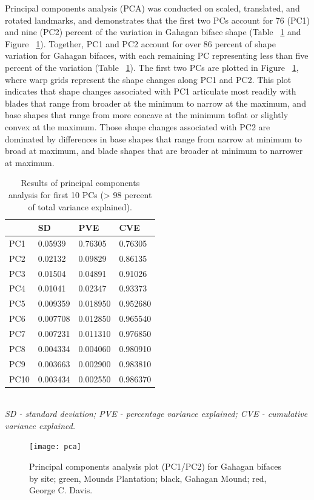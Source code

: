 \documentclass[review]{elsarticle}
\begin{document}
Principal components analysis (PCA) was conducted on scaled, translated, and rotated landmarks, and demonstrates that the first two PCs account for 76 (PC1) and nine (PC2) percent of the variation in Gahagan biface shape (Table ~\ref{tab:Tbl2} and Figure ~\ref{fig:FigPCA}). Together, PC1 and PC2 account for over 86 percent of shape variation for Gahagan bifaces, with each remaining PC representing less than five percent of the variation (Table ~\ref{tab:Tbl2}). The first two PCs are plotted in Figure ~\ref{fig:FigPCA}, where warp grids represent the shape changes along PC1 and PC2. This plot indicates that shape changes associated with PC1 articulate most readily with blades that range from broader at the minimum to narrow at the maximum, and base shapes that range from more concave at the minimum toflat or slightly convex at the maximum. Those shape changes associated with PC2 are dominated by differences in base shapes that range from narrow at minimum to broad at maximum, and blade shapes that are broader at minimum to narrower at maximum.

\begin{table}[tbh]\centering
\footnotesize
\caption{Results of principal components analysis for first 10 PCs (> 98 percent of total variance explained).}
\centering
\begin{tabular}{lp{2cm}p{2cm}p{2cm}}
\toprule
 & SD & PVE & CVE\\
\midrule
PC1 & 0.05939 & 0.76305 & 0.76305\\
PC2 & 0.02132 & 0.09829 & 0.86135\\
PC3 & 0.01504 & 0.04891 & 0.91026\\
PC4 & 0.01041 & 0.02347 & 0.93373\\
PC5 & 0.009359 & 0.018950 & 0.952680\\
PC6 & 0.007708 & 0.012850 & 0.965540\\
PC7 & 0.007231 & 0.011310 & 0.976850\\
PC8 & 0.004334 & 0.004060 & 0.980910\\
PC9 & 0.003663 & 0.002900 & 0.983810\\
PC10 & 0.003434 & 0.002550 & 0.986370\\
\bottomrule
\end{tabular}
\bigskip
\\\textit{SD - standard deviation; PVE - percentage variance explained; CVE - cumulative variance explained.}
\label{tab:Tbl2}
\end{table}

\begin{figure}[ht]\centering
\texttt{[image: pca]}
\caption{Principal components analysis plot (PC1/PC2) for Gahagan bifaces by site; green, Mounds Plantation; black, Gahagan Mound; red, George C. Davis.}
\label{fig:FigPCA}
\end{figure}
\end{document}
